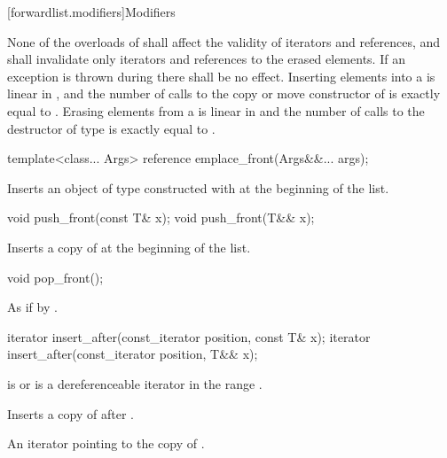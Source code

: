[forwardlist.modifiers]{Modifiers}

\pnum
None of the overloads of  shall affect the validity of iterators and
references, and  shall invalidate only iterators and references to
the erased elements. If an exception is thrown during  there shall
be no effect. Inserting  elements into a  is linear in
, and the number of calls to the copy or move constructor of  is
exactly equal to . Erasing  elements from a  is
linear in  and the number of calls to the destructor of type  is
exactly equal to .

%
\begin{itemdecl}
template<class... Args> reference emplace_front(Args&&... args);
\end{itemdecl}

\begin{itemdescr}
\pnum
\effects
Inserts an object of type  constructed with
 at the beginning of the list.
\end{itemdescr}

%
\begin{itemdecl}
void push_front(const T& x);
void push_front(T&& x);
\end{itemdecl}

\begin{itemdescr}
\pnum
\effects
Inserts a copy of  at the beginning of the list.
\end{itemdescr}


%
\begin{itemdecl}
void pop_front();
\end{itemdecl}

\begin{itemdescr}
\pnum
\effects
As if by .
\end{itemdescr}

%
\begin{itemdecl}
iterator insert_after(const_iterator position, const T& x);
iterator insert_after(const_iterator position, T&& x);
\end{itemdecl}

\begin{itemdescr}
\pnum
\expects
{} is  or is a dereferenceable
iterator in the range .

\pnum
\effects
Inserts a copy of  after .

\pnum
\returns
An iterator pointing to the copy of .
\end{itemdescr}

